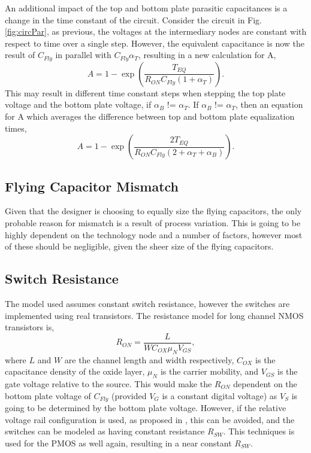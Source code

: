 \documentclass[conference]{article}
\begin{document}
 	An additional impact of the top and bottom plate parasitic capacitances is a change in the time constant of the circuit. Consider the circuit in Fig. \ref{fig:circPar}, as previous, the voltages at the intermediary nodes are constant with respect to time over a single step. However, the equivalent capacitance is now the result of $C_{Fly}$ in parallel with $C_{Fly}\alpha_T$, resulting in a new calculation for A,
 	\begin{equation}
 	A = 1 - \exp\left(\frac{T_{EQ}}{R_{ON}C_{Fly}(1+\alpha_T)}\right).
 	\end{equation}
 	This may result in different time constant steps when stepping the top plate voltage and the bottom plate voltage, if $\alpha_B$ != $\alpha_T$. If $\alpha_B$ != $\alpha_T$, then an equation for A which averages the difference between top and bottom plate equalization times,
 	\begin{equation}
 	A = 1 - \exp\left(\frac{2T_{EQ}}{R_{ON}C_{Fly}(2+\alpha_T+\alpha_B)}\right).
 	\end{equation}
 	\subsection{Flying Capacitor Mismatch}
 	Given that the designer is choosing to equally size the flying capacitors, the only probable reason for mismatch is a result of process variation. This is going to be highly dependent on the technology node and a number of factors, however most of these should be negligible, given the sheer size of the flying capacitors. 
 	
 	\subsection{Switch Resistance}
 	The model used assumes constant switch resistance, however the switches are implemented using real transistors. The resistance model for long channel NMOS transistors is,
 	\begin{equation}
 	R_{ON} = \frac{L}{WC_{OX}\mu_N V_{GS}},
 	\end{equation}
 	where $L$ and $W$ are the channel length and width respectively, $C_{OX}$ is the capacitance density of the oxide layer, $\mu_N$ is the carrier mobility, and $V_{GS}$ is the gate voltage relative to the source. This would make the $R_{ON}$ dependent on the bottom plate voltage of $C_{Fly}$ (provided $V_G$ is a constant digital voltage) as $V_{S}$ is going to be determined by the bottom plate voltage. However, if the relative voltage rail configuration is used, as proposed in \cite{Butzen2019}, this can be avoided, and the switches can be modeled as having constant resistance $R_{SW}$. This techniques is used for the PMOS as well again, resulting in a near constant $R_{SW}$.
 	
\end{document}
